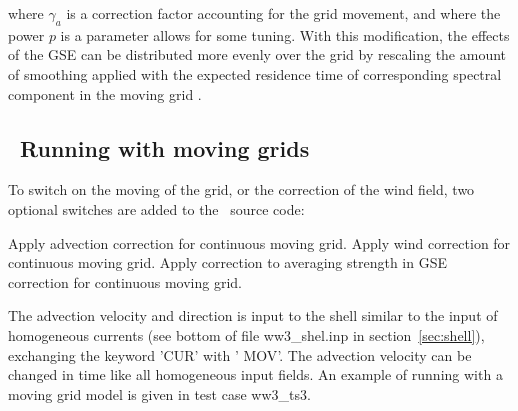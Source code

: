 \noindent
where $\gamma_a$ is a correction factor accounting for the grid movement, and
where the power $p$ is a parameter allows for some tuning. With this
modification, the effects of the GSE can be distributed more evenly over the
grid by rescaling the amount of smoothing applied with the expected residence
time of corresponding spectral component in the moving grid
\citep[see][]{tol:OMOD05b}.


\vssub
\subsection{~Running with moving grids} \label{sec:move_run}
\vssub

To switch on the moving of the grid, or the correction of the wind field, two
optional switches are added to the \ws\ source code:

\begin{slist}
 {Apply advection correction for continuous moving grid.}
 {Apply wind correction for continuous moving grid.}
 {Apply correction to averaging strength in GSE correction for
           continuous moving grid.}
\end{slist}

\noindent
The advection velocity and direction is input to the shell similar to the
input of homogeneous currents (see bottom of file {\file ww3\_shel.inp} in
section~\ref{sec:shell}), exchanging the keyword '{\code CUR}' with '{\code
MOV}'. The advection velocity can be changed in time like all homogeneous
input fields. An example of running with a moving grid model is given in test
case {\file ww3\_ts3}.

\bpage \pagestyle{empty}
